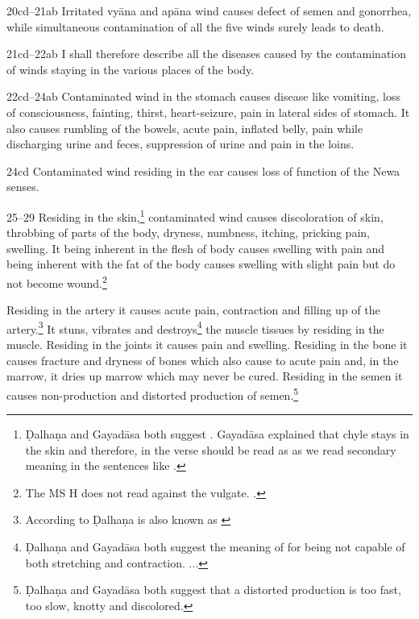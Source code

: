 \begin{translation}
{\item[20cd--21ab] Irritated vyāna and apāna wind causes defect of 
semen 
and gonorrhea, while simultaneous contamination of all the five winds surely 
leads to death.  


\item[21cd--22ab] I shall therefore describe all the diseases caused by the 
contamination of winds staying in the various places of the body.

\item[22cd--24ab] Contaminated wind in the stomach causes disease like
vomiting, loss of consciousness, fainting, thirst, heart-seizure, pain in
lateral sides of stomach. It also causes rumbling of the bowels, acute
pain, inflated belly, pain while discharging urine and feces, suppression
of urine and pain in the loins.

\item[24cd]Contaminated wind residing in the ear causes loss of function of 
the Newa
senses.

\item[25--29] Residing in the skin,\footnote{Ḍalhaṇa and Gayadāsa both 
suggest . Gayadāsa explained that chyle stays in the skin and 
therefore, in the verse  should be read as  as we 
read 
secondary meaning in the sentences like .} 
contaminated 
wind causes discoloration of skin, throbbing of parts of the body, dryness, 
numbness, itching, pricking pain, swelling. It being inherent in the flesh of body 
causes swelling with pain and being inherent with the fat of the body causes 
swelling with slight pain but do not become wound.\footnote{The MS H does 
not 
read  against the 
vulgate. 
\citep[261]{vulgate}.}

Residing in the artery it causes acute pain, contraction and filling up of the 
artery.\footnote{According to Ḍalhaṇa  is also known as 
 \citep[262]{vulgate}} It stuns, vibrates and 
destroys\footnote{Ḍalhaṇa and Gayadāsa both suggest the meaning of 
 for being not capable of both stretching and contraction. 
\citep[262]{vulgate} 
...} 
the muscle tissues by residing in the muscle. Residing in the joints it causes 
pain 
and swelling. Residing in the bone it causes fracture and dryness of bones 
which 
also cause to acute pain and, in the marrow, it dries up marrow which may 
never 
be cured. Residing in the semen it causes non-production and distorted 
production of semen.\footnote{Ḍalhaṇa and Gayadāsa both suggest that a 
distorted production  is too fast, too slow, knotty and 
discolored.} 


}
\end{translation}
